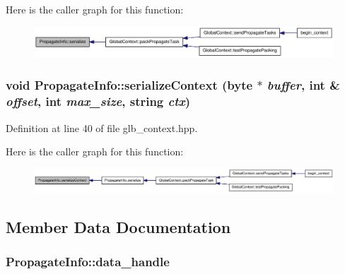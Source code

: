 Here is the caller graph for this function:\nopagebreak
\begin{figure}[H]
\begin{center}
\leavevmode
\includegraphics[width=352pt]{struct_propagate_info_ac7242171f175704c50333d053aa72c72_icgraph}
\end{center}
\end{figure}
\hypertarget{struct_propagate_info_a22a3541d5c61ed5e6db3aeaf8c4a2f82}{
\subsubsection[{serializeContext}]{\setlength{\rightskip}{0pt plus 5cm}void PropagateInfo::serializeContext ({\bf byte} $\ast$ {\em buffer}, \/  int \& {\em offset}, \/  int {\em max\_\-size}, \/  string {\em ctx})}}
\label{struct_propagate_info_a22a3541d5c61ed5e6db3aeaf8c4a2f82}


Definition at line 40 of file glb\_\-context.hpp.

Here is the caller graph for this function:\nopagebreak
\begin{figure}[H]
\begin{center}
\leavevmode
\includegraphics[width=420pt]{struct_propagate_info_a22a3541d5c61ed5e6db3aeaf8c4a2f82_icgraph}
\end{center}
\end{figure}


\subsection{Member Data Documentation}
\hypertarget{struct_propagate_info_abd2d16e1244a316b81e4ea55bf672078}{
\subsubsection[{data\_\-handle}]{ {\bf PropagateInfo::data\_\-handle}}}
\label{struct_propagate_info_abd2d16e1244a316b81e4ea55bf672078}



